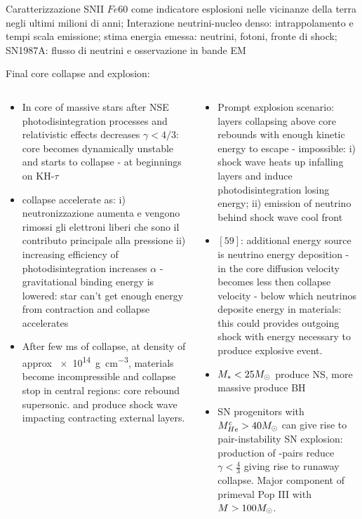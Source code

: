 \begin{frame}{Caratterizzazione SNII}
$Fe60$ come indicatore esplosioni nelle vicinanze della terra negli ultimi milioni di anni; Interazione neutrini-nucleo denso: intrappolamento e tempi scala emissione; stima energia emessa: neutrini, fotoni, fronte di shock; SN1987A: flusso di neutrini e osservazione in bande EM
\end{frame}

\begin{frame}{Final core collapse and explosion: }
\begin{columns}[T]
\begin{column}{0.50\textwidth}
	\begin{itemize}
	\item In core of massive stars after NSE photodisintegration processes and relativistic effects decreases $\gamma<4/3$: core becomes dynamically unstable and starts to collapse - at beginnings on KH-$\tau$
	\item collapse accelerate as: i) neutronizzazione aumenta e vengono rimossi gli elettroni liberi che sono il contributo principale alla pressione ii) increasing efficiency of photodisintegration increases $\alpha$ - gravitational binding energy is lowered: star can't get enough energy from contraction and collapse accelerates
\item After few \si{\milli\second} of collapse, at density of approx \SI{e14}{\gram\per\cubic\cm}, materials become incompressible and collapse stop in central regions: core rebound supersonic. and produce shock wave impacting contracting external layers.
	\end{itemize}
	\end{column}
	\begin{column}{0.45\textwidth}
	\begin{itemize}
	\item Prompt explosion scenario: layers collapsing above core rebounds with enough kinetic energy to escape - impossible: i) shock wave heats up infalling layers and induce photodisintegration losing energy; ii) emission of neutrino behind shock wave cool front 
\item $[59]$: additional energy source is neutrino energy deposition - in the core \Pnue diffusion velocity becomes less then collapse velocity -  below which neutrinos deposite energy in materials: this could provides outgoing shock with energy necessary to produce explosive event.
	\item $M_*<25M_{\odot}$ produce NS, more massive produce BH
    \item SN progenitors with $M_{He}^c>40M_{\odot}{}$ can give rise to pair-instability SN explosion: production of \Pelectron-\APelectron pairs reduce $\gamma<\frac{4}{3}$ giving rise to runaway collapse. Major component of primeval Pop III with $M>100M_{\odot}$.
	\end{itemize}
\end{column}\end{columns}
\end{frame}

